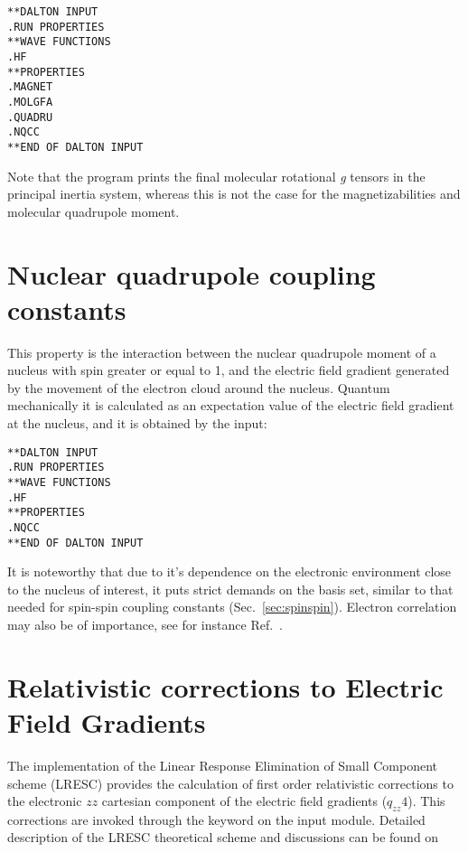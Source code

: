 \begin{verbatim}
**DALTON INPUT
.RUN PROPERTIES
**WAVE FUNCTIONS
.HF
**PROPERTIES
.MAGNET
.MOLGFA
.QUADRU
.NQCC
**END OF DALTON INPUT
\end{verbatim}

Note that the program prints the final molecular rotational {\em g}
tensors in the
principal inertia system, whereas this is not the case for the
magnetizabilities and molecular quadrupole moment.

\section{Nuclear quadrupole coupling constants}

This property is the interaction between the nuclear quadrupole moment
of a nucleus with spin greater or equal to 1, and the electric field gradient
generated by the movement of the electron cloud around the nucleus.
Quantum mechanically it is calculated as an expectation value of the electric
field gradient  at the nucleus, and it is obtained by the input:

\begin{verbatim}
**DALTON INPUT
.RUN PROPERTIES
**WAVE FUNCTIONS
.HF
**PROPERTIES
.NQCC
**END OF DALTON INPUT
\end{verbatim}

It is noteworthy that due to it's dependence on the
electronic environment close to the nucleus of interest, it puts strict
demands on the basis set, similar to that needed for spin-spin
coupling
constants (Sec.~\ref{sec:spinspin}). Electron correlation may also be of
importance, see for instance Ref.~\cite{mjssocpjthkrcpl243}.


\section{Relativistic corrections to Electric Field Gradients}\label{sec:lresc-efg}

The implementation of the Linear Response Elimination of Small Component scheme (LRESC) provides the calculation of first order relativistic corrections to the electronic $zz$ cartesian component of the electric field gradients ($q_{zz}4$). This corrections are invoked through the keyword  on the  input module. Detailed description of the LRESC theoretical scheme and discussions can be found on

